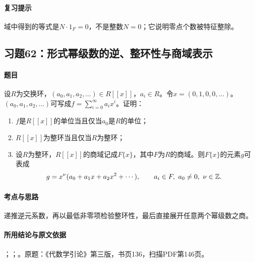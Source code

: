 \paragraph{复习提示}

域中得到的等式是$N\cdot1_F=0$，不是整数$N=0$；它说明零点个数被特征整除。



\subsection{习题62：形式幂级数的逆、整环性与商域表示}

\label{ex:3:62}

\paragraph{题目}

设$R$为交换环，$(a_0,a_1,a_2,\ldots)\in R[[x]]$，$a_i\in R$。令$x=(0,1,0,0,\ldots)$。$(a_0,a_1,a_2,\ldots)$可写成$f=\sum\limits_{i=0}^{\infty}a_ix^i$。证明：
\begin{enumerate}[label=(\roman*)]
\item $f$是$R[[x]]$的单位当且仅当$a_0$是$R$的单位；
\item $R[[x]]$为整环当且仅当$R$为整环；
\item 设$R$为整环，$R[[x]]$的商域记成$F\{x\}$，其中$F$为$R$的商域。则$F\{x\}$的元素$g$可表成
\[
g=x^\nu(a_0+a_1x+a_2x^2+\cdots),\qquad a_i\in F,\ a_0\ne0,\ \nu\in\mathbb Z.
\]
\end{enumerate}

\paragraph{考点与思路}

递推逆元系数，再以最低非零项检验整环性，最后直接展开任意两个幂级数之商。

\paragraph{所用结论与原文依据}

；；。原题：《代数学引论》第三版，书页136，扫描PDF第146页。


